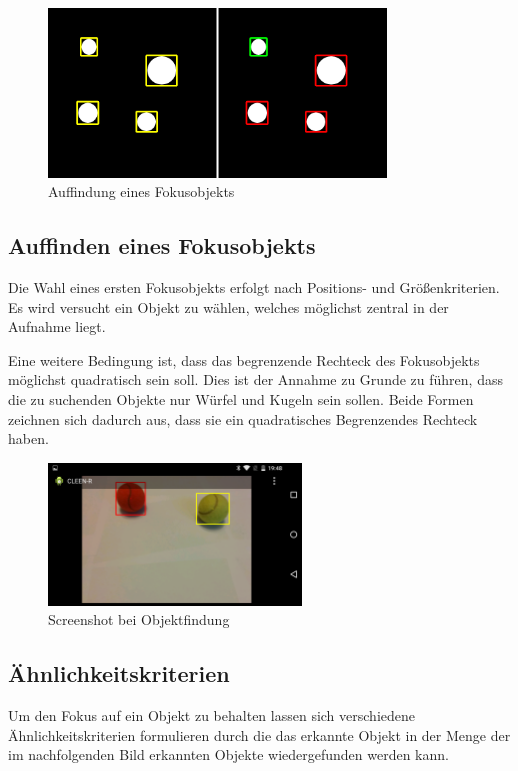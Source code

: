 \pagebreak

\begin{figure}[h]
\centering
\includegraphics[width=0.8\textwidth]{Bilder/Workloop/Markierung}
\caption{Auffindung eines Fokusobjekts}
\label{fig:Markierung}
\end{figure}

\subsection{Auffinden eines Fokusobjekts}
\label{subsec:Auffindung}
Die Wahl eines ersten Fokusobjekts erfolgt nach Positions- und Größenkriterien. Es wird versucht ein Objekt zu wählen, welches möglichst zentral in der Aufnahme liegt. 

Eine weitere Bedingung ist, dass das begrenzende Rechteck des Fokusobjekts möglichst quadratisch sein soll. Dies ist der Annahme zu Grunde zu führen, dass die zu suchenden Objekte nur Würfel und Kugeln sein sollen. Beide Formen zeichnen sich dadurch aus, dass sie ein quadratisches Begrenzendes Rechteck haben.

\begin{figure}[h]
\centering
\includegraphics[width=0.6\textwidth]{Bilder/Workloop/ObjectFindingScreenshot}
\caption{Screenshot bei Objektfindung}
\label{fig:ObjektfindungScreenshot}
\end{figure}

\subsection{Ähnlichkeitskriterien}
\label{subsec:Similarity}
Um den Fokus auf ein Objekt zu behalten lassen sich verschiedene Ähnlichkeitskriterien formulieren durch die das erkannte Objekt in der Menge der im nachfolgenden Bild erkannten Objekte wiedergefunden werden kann.



